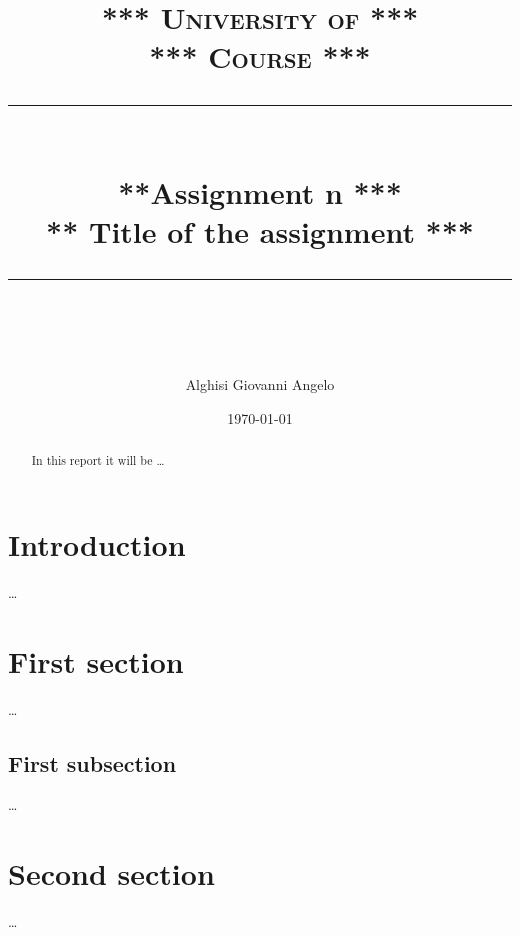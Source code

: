 \documentclass[a4paper]{article}
\title{
	\normalfont \normalsize 
	\textsc{*** University of ***\\ 
		*** Course ***} \\[10pt]
	\rule{\linewidth}{0.5pt}\\
	\vspace{0.3cm}
	\Large ***Assignment n ***\\
	\vspace{0.3cm}
	\huge \bf *** Title of the assignment *** \normalsize
	\vspace{0.3cm}
	\rule{\linewidth}{0.5pt}  \\
}
\author{Alghisi Giovanni Angelo}
\date{\normalsize \today}
\begin{document}
	
	\maketitle
	
	\begin{abstract}
		In this report it will be \dots
	\end{abstract}
	
	\tableofcontents
	
	\section{Introduction}
		\dots
	
	\section{First section}
		\dots
			
		\subsection*{First subsection}
			\dots
			
	\section{Second section}
		\dots
		
	\nocite{*}
	\printbibliography 
		
\end{document}
